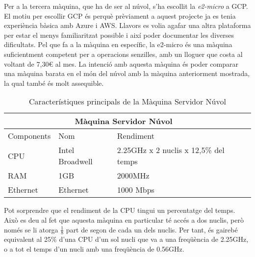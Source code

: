 Per a la tercera màquina, que ha de ser al núvol, s'ha escollit la \textit{e2-micro} a GCP. El motiu per escollir GCP és perquè prèviament a aquest projecte ja es tenia experiència bàsica amb Azure i AWS. Llavors es volia agafar una altra plataforma per estar el menys familiaritzat possible i així poder documentar les diverses dificultats. Pel que fa a la màquina en específic, la e2-micro és una màquina suficientment competent per a operacions senzilles, amb un lloguer que costa al voltant de 7,30€ al mes. La intenció amb aquesta màquina és poder comparar una màquina barata en el món del núvol amb la màquina anteriorment mostrada, la qual també és molt assequible.

\begin{table}[ht]
\centering
\begin{tabular}{ |p{3cm}||p{3cm}|p{3cm}|p{3cm}|  }
 \hline
 \multicolumn{3}{|c|}{Màquina Servidor Núvol} \\
 \hline
 Components & Nom & Rendiment \\
 \hline
 CPU  & Intel Broadwell &  2.25GHz x 2 nuclis x 12,5\% del temps\\
 RAM & 1GB  &  2000MHz   \\ %
 Ethernet & Ethernet & 1000 Mbps\\ 
 \hline
\end{tabular}
\caption{Característiques principals de la Màquina Servidor Núvol}
\label{Tab:MaquinaServidorNuvul}
\end{table}

Pot sorprendre que el rendiment de la CPU tingui un percentatge del temps. Això es deu al fet que aquesta màquina en particular té accés a dos nuclis, però només se li atorga $\frac{1}{8}$ part de segon de cada un dels nuclis. Per tant, és gairebé equivalent al 25\% d'una CPU d'un sol nucli que va a una freqüència de 2.25GHz, o a tot el temps d'un nucli amb una freqüència de 0.56GHz.
